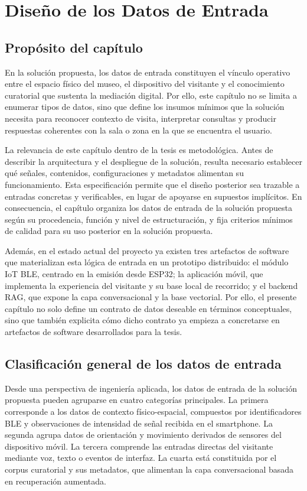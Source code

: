 \chapter{Diseño de los Datos de Entrada}

\section{Propósito del capítulo}

En la solución propuesta, los datos de entrada constituyen el vínculo operativo entre el espacio físico del museo, el dispositivo del visitante y el conocimiento curatorial que sustenta la mediación digital. Por ello, este capítulo no se limita a enumerar tipos de datos, sino que define los insumos mínimos que la solución necesita para reconocer contexto de visita, interpretar consultas y producir respuestas coherentes con la sala o zona en la que se encuentra el usuario.

La relevancia de este capítulo dentro de la tesis es metodológica. Antes de describir la arquitectura y el despliegue de la solución, resulta necesario establecer qué señales, contenidos, configuraciones y metadatos alimentan su funcionamiento. Esta especificación permite que el diseño posterior sea trazable a entradas concretas y verificables, en lugar de apoyarse en supuestos implícitos. En consecuencia, el capítulo organiza los datos de entrada de la solución propuesta según su procedencia, función y nivel de estructuración, y fija criterios mínimos de calidad para su uso posterior en la solución propuesta.

Además, en el estado actual del proyecto ya existen tres artefactos de software que materializan esta lógica de entrada en un prototipo distribuido: el módulo IoT BLE, centrado en la emisión desde ESP32; la aplicación móvil, que implementa la experiencia del visitante y su base local de recorrido; y el backend RAG, que expone la capa conversacional y la base vectorial. Por ello, el presente capítulo no solo define un contrato de datos deseable en términos conceptuales, sino que también explicita cómo dicho contrato ya empieza a concretarse en artefactos de software desarrollados para la tesis.

\section{Clasificación general de los datos de entrada}

Desde una perspectiva de ingeniería aplicada, los datos de entrada de la solución propuesta pueden agruparse en cuatro categorías principales. La primera corresponde a los datos de contexto físico-espacial, compuestos por identificadores BLE y observaciones de intensidad de señal recibida en el smartphone. La segunda agrupa datos de orientación y movimiento derivados de sensores del dispositivo móvil. La tercera comprende las entradas directas del visitante mediante voz, texto o eventos de interfaz. La cuarta está constituida por el corpus curatorial y sus metadatos, que alimentan la capa conversacional basada en recuperación aumentada.

